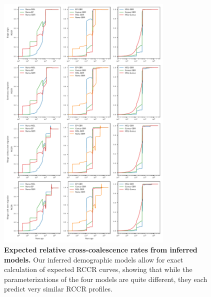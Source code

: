 \documentclass[]{article}
\begin{document}
\begin{figure}[ht]
    \centering
    \includegraphics[width=0.75\textwidth]{figures/supp-relate-rccr-model-exp.pdf}
    \caption{
        \textbf{Expected relative cross-coalescence rates from inferred models.}
        Our inferred demographic models allow for exact calculation of expected
        RCCR curves, showing that while the parameterizations of the four models
        are quite different, they each predict very similar RCCR profiles.
    }
    \label{fig:supp-rccr-exp}
\end{figure}
\end{document}
